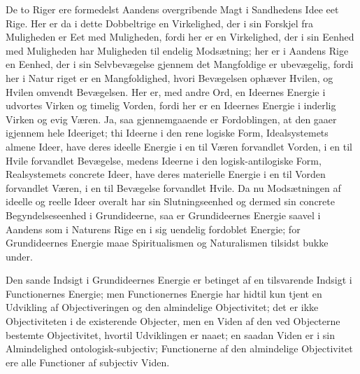\documentclass[12pt]{book}
\newcommand{\apage}[1]{\marginnote{\footnotesize\textit{[#1]}}}
\begin{document}
De to Riger ere formedelst Aandens overgribende Magt i Sandhedens Idee eet Rige. Her er da i dette
Dobbeltrige en Virkelighed, der i sin Forskjel fra Muligheden er Eet med Muligheden, fordi her er en
Virkelighed, der i sin Eenhed med Muligheden har Muligheden til endelig Modsætning; her er i Aandens
Rige en Eenhed, der i sin Selvbevægelse gjennem det Mangfoldige er ubevægelig, fordi her i Natur\-%
riget \apage{456} er en Mangfoldighed, hvori Bevægelsen ophæver Hvilen, og Hvilen omvendt Bevægelsen. Her er, med
andre Ord, en Ideernes Energie i udvortes Virken og timelig Vorden, fordi her er en Ideernes Energie i
inderlig Virken og evig Væren. Ja, saa gjennemgaaende er Fordoblingen, at den gaaer igjennem hele
Ideeriget; thi Ideerne i den rene logiske Form, Idealsystemets almene Ideer, have deres ideelle
Energie i en til Væren forvandlet Vorden, i en til Hvile forvandlet Bevægelse, medens Ideerne i den
logisk-antilogiske Form, Realsystemets concrete Ideer, have deres materielle Energie i en til Vorden
forvandlet Væren, i en til Bevægelse forvandlet Hvile. Da nu Modsætningen af ideelle og reelle Ideer
overalt har sin Slutningseenhed og dermed sin concrete Begyndelseseenhed i Grundideerne, saa er
Grundideernes Energie saavel i Aandens som i Naturens Rige en i sig uendelig fordoblet Energie; for
Grundideernes Energie maae Spiritualismen og Naturalismen tilsidst bukke under.

Den sande Indsigt i Grundideernes Energie er betinget af en tilsvarende Indsigt i Functionernes
Energie; men Functionernes Energie har hidtil kun tjent en Udvikling af Objectiveringen og den
almindelige Objectivitet; det er ikke Objectiviteten i de existerende Objecter, men en Viden af den
ved Objecterne bestemte Objectivitet, hvortil Udviklingen er naaet; en saadan Viden er i sin
Almindelighed ontologisk-subjectiv; Functionerne af den almindelige Objectivitet ere alle Functioner
af subjectiv Viden.
\end{document}
